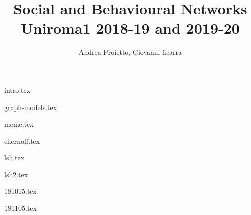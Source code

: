 \documentclass{report}
\title{
    Social and Behavioural Networks \\
    \large Uniroma1 2018-19 and 2019-20
}
\author{Andrea Proietto, Giovanni ficarra}
\theoremstyle{definition}
\theoremstyle{remark}
\theoremstyle{remark}
\begin{document}
\maketitle

\tableofcontents


{intro.tex}

{graph-models.tex}

{meme.tex}

{chernoff.tex}
	
{lsh.tex}

{lsh2.tex}

{181015.tex}

{181105.tex}

\end{document}
